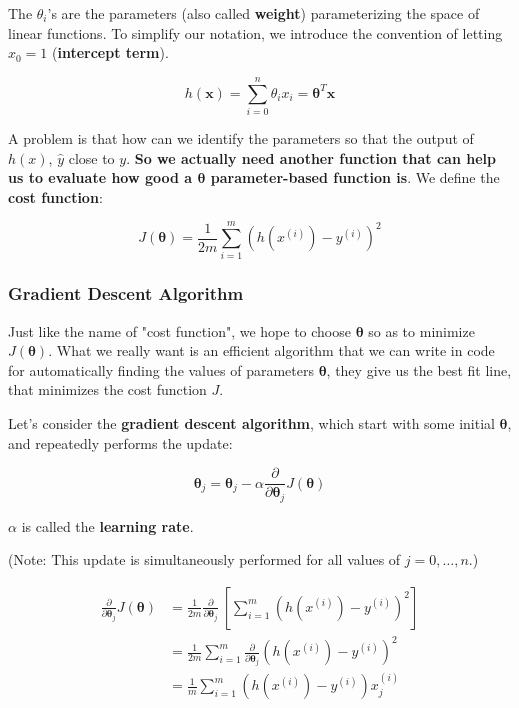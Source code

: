 \documentclass[fontset=windows,pass]{article}
\numberwithin{equation}{subsection} %
\begin{document}
The $\theta_i$'s are the parameters (also called \textbf{weight}) parameterizing the space of linear functions.
To simplify our notation, we introduce the convention of letting $x_0 = 1$ (\textbf{intercept term}).

\[
	h(\boldsymbol{x}) = \sum_{i=0}^{n} \theta_i x_i = \boldsymbol{\theta}^T \boldsymbol{x}
\]

A problem is that how can we identify the parameters so that the output of $h(x)$, $\hat{y}$ close to $y$.
\textbf{So we actually need another function that can help us to evaluate how good a $\boldsymbol{\theta}$ parameter-based function is}.
We define the \textbf{cost function}:

\begin{equation}
	J(\boldsymbol{\theta}) = \frac{1}{2m} \sum_{i=1}^{m} \left(h(x^{(i)})-y^{(i)}\right)^2
\end{equation}

\subsubsection{Gradient Descent Algorithm}

Just like the name of "cost function", we hope to choose $\boldsymbol{\theta}$ so as to 
minimize $J(\boldsymbol{\theta})$. What we really want is an efficient algorithm that we can write
in code for automatically finding the values of parameters $\boldsymbol{\theta}$, they give us the
best fit line, that minimizes the cost function $J$.

Let's consider the \textbf{gradient descent algorithm}, which start with some initial $\boldsymbol{\theta}$, and 
repeatedly performs the update:

\begin{equation}
	\boldsymbol{\theta}_j = \boldsymbol{\theta}_j-\alpha \frac{\partial}{\partial \boldsymbol{\theta}_j} J(\boldsymbol{\theta}) 
\end{equation}

$\alpha$ is called the \textbf{learning rate}.

(Note: This update is simultaneously performed for all values of $j = 0, \dots, n$.)


\begin{align*}
	\frac{\partial}{\partial \boldsymbol{\theta}_j} J(\boldsymbol{\theta}) & = \frac{1}{2m} \frac{\partial}{\partial \boldsymbol{\theta}_j}\
				\left[\sum_{i=1}^{m} \left(h(x^{(i)})-y^{(i)}\right)^2\right]\\
	& = \frac{1}{2m} \sum_{i=1}^{m}  \frac{\partial}{\partial \boldsymbol{\theta}_j} \left(h(x^{(i)})-y^{(i)}\right)^2\\
	& = \frac{1}{m} \sum_{i=1}^{m} \left(h(x^{(i)})-y^{(i)}\right) x^{(i)}_{j}
\end{align*}
\end{document}
